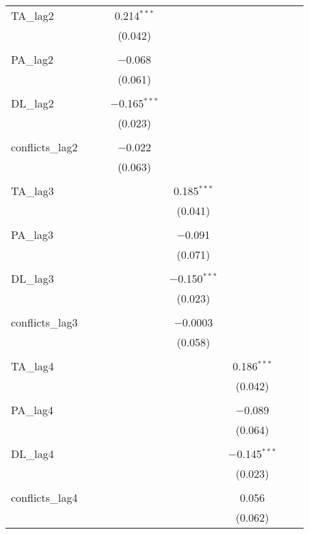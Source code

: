 \begin{table}[!htbp]
\begin{tabular}{@{\extracolsep{5pt}}lccccccc}
 TA\_lag2 &  &  & 0.214$^{***}$ &  &  &  &  \\ 
  &  &  & (0.042) &  &  &  &  \\ 
  & & & & & & & \\ 
 PA\_lag2 &  &  & $-$0.068 &  &  &  &  \\ 
  &  &  & (0.061) &  &  &  &  \\ 
  & & & & & & & \\ 
 DL\_lag2 &  &  & $-$0.165$^{***}$ &  &  &  &  \\ 
  &  &  & (0.023) &  &  &  &  \\ 
  & & & & & & & \\ 
 conflicts\_lag2 &  &  & $-$0.022 &  &  &  &  \\ 
  &  &  & (0.063) &  &  &  &  \\ 
  & & & & & & & \\ 
 TA\_lag3 &  &  &  & 0.185$^{***}$ &  &  &  \\ 
  &  &  &  & (0.041) &  &  &  \\ 
  & & & & & & & \\ 
 PA\_lag3 &  &  &  & $-$0.091 &  &  &  \\ 
  &  &  &  & (0.071) &  &  &  \\ 
  & & & & & & & \\ 
 DL\_lag3 &  &  &  & $-$0.150$^{***}$ &  &  &  \\ 
  &  &  &  & (0.023) &  &  &  \\ 
  & & & & & & & \\ 
 conflicts\_lag3 &  &  &  & $-$0.0003 &  &  &  \\ 
  &  &  &  & (0.058) &  &  &  \\ 
  & & & & & & & \\ 
 TA\_lag4 &  &  &  &  & 0.186$^{***}$ &  &  \\ 
  &  &  &  &  & (0.042) &  &  \\ 
  & & & & & & & \\ 
 PA\_lag4 &  &  &  &  & $-$0.089 &  &  \\ 
  &  &  &  &  & (0.064) &  &  \\ 
  & & & & & & & \\ 
 DL\_lag4 &  &  &  &  & $-$0.145$^{***}$ &  &  \\ 
  &  &  &  &  & (0.023) &  &  \\ 
  & & & & & & & \\ 
 conflicts\_lag4 &  &  &  &  & 0.056 &  &  \\ 
  &  &  &  &  & (0.062) &  &  \\ 

\end{tabular}
\end{table}
